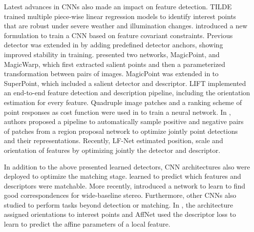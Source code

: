 Latest advances in CNNs also made an impact on feature detection. TILDE \cite{TILDE} trained multiple piece-wise linear regression models to identify interest points that are robust under severe weather and illumination changes. \cite{Karel_Vedaldi_ECCV_16} introduced a new formulation to train a CNN based on feature covariant constraints. 
Previous detector was extended in \cite{Zhang_Felix_CVPR_17} by adding predefined detector anchors, showing improved stability in training. \cite{DeTone_MagicPoint17} presented two networks, MagicPoint, and MagicWarp, which first extracted salient points and then a parameterized transformation between pairs of images. MagicPoint was extended in \cite{detone2017superpoint} to SuperPoint, which included a salient detector and descriptor.
LIFT \cite{LIFT} implemented an end-to-end feature detection and description pipeline, including the orientation estimation for every feature. Quadruple image patches and a ranking scheme of point responses as cost function were used in \cite{savinov2016quad} to train a neural network. In \cite{Georgakis_Karanam_CVPR18}, authors proposed a pipeline to automatically sample positive and negative pairs of patches from a region proposal network to optimize jointly point detections and their representations. Recently, LF-Net \cite{OnoSerra18} estimated position, scale and orientation of features by optimizing jointly the detector and descriptor. \par

In addition to the above presented learned detectors, CNN architectures also were deployed to optimize the matching stage. \cite{Hartmann_Havlena_CVPR14} learned to predict which features and descriptors were matchable. More recently, \cite{Yi_Trulls_Good_Corr_CVPR18} introduced a network to learn to find good correspondences for wide-baseline stereo. Furthermore, other CNNs also studied to perform tasks beyond detection or matching. In \cite{Yi_Verdie_Fua_Lepetit_CVPR16}, the architecture assigned orientations to interest points and AffNet \cite{Mishkin_Radenovic_Matas_AffNet_18} used the descriptor loss to learn to predict the affine parameters of a local feature. 



